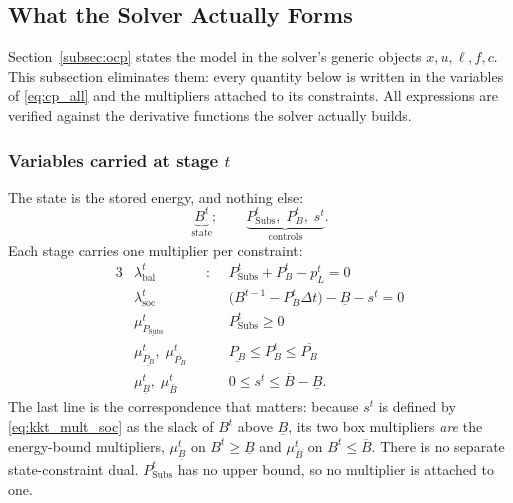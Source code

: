 \subsection{What the Solver Actually Forms}
\label{subsec:kkt}

Section~\ref{subsec:ocp} states the model in the solver's generic objects
$x, u, \ell, f, c$.  This subsection eliminates them: every quantity below is
written in the variables of \eqref{eq:cp_all} and the multipliers attached to
its constraints.  All expressions are verified against the derivative functions
the solver actually builds.

\subsubsection{Variables carried at stage $t$}
The state is the stored energy, and nothing else:
\begin{equation}
\underbrace{B^t}_{\text{state}}; \qquad
\underbrace{P_{\text{Subs}}^t,\; P_B^t,\; s^t}_{\text{controls}} .
\label{eq:kkt_vars}
\end{equation}
Each stage carries one multiplier per constraint:
\begin{alignat}{3}
&\lambda_{\text{bal}}^t   &\;\;:\;\;& P_{\text{Subs}}^t + P_B^t - p_L^t = 0
\label{eq:kkt_mult_bal}\\
&\lambda_{\text{soc}}^t    && \bigl(B^{t-1} - P_B^t \Delta t\bigr) - \underline B - s^t = 0
\label{eq:kkt_mult_soc}\\
&\mu_{\underline{P_{\mathrm{Subs}}}}^t && P_{\text{Subs}}^t \geq 0
\label{eq:kkt_mult_ps}\\
&\mu_{\underline{P_B}}^t,\; \mu_{\overline{P_B}}^t && \underline{P_B} \leq P_B^t \leq \overline{P_B}
\label{eq:kkt_mult_pb}\\
&\mu_{\underline B}^t,\; \mu_{\overline B}^t && 0 \leq s^t \leq \overline B - \underline B .
\label{eq:kkt_mult_b}
\end{alignat}
The last line is the correspondence that matters: because $s^t$ is defined by
\eqref{eq:kkt_mult_soc} as the slack of $B^{t}$ above $\underline B$, its two box
multipliers \emph{are} the energy-bound multipliers,
$\mu_{\underline B}^t$ on $B^{t} \geq \underline B$ and $\mu_{\overline B}^t$ on
$B^{t} \leq \overline B$.  There is no separate state-constraint dual.
$P_{\text{Subs}}^t$ has no upper bound, so no multiplier is attached to one.

